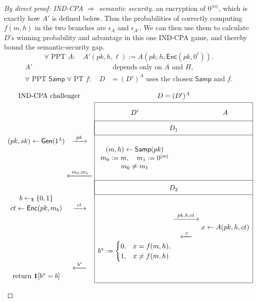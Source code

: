 \documentclass[12pt,a4paper]{article}
\theoremstyle{definition}
\theoremstyle{remark}
\begin{document}
\begin{proof}[By direct proof: IND-CPA $\Longrightarrow$ semantic security]
an encryption of $0^{|m|}$, which is exactly how $A'$ is defined below.
Thus the probabilities of correctly computing $f(m,h)$ in the two branches
are $\epsilon_A$ and $\epsilon_{A'}$. We can then use them to calculate
$D$'s winning probability and advantage in this one IND-CPA game,
and thereby bound the semantic-security gap.
\[
\forall\text{ PPT }A:\quad
A'(pk,h,\ell):=A(pk,h,\mathsf{Enc}(pk,0^\ell)).
\]
\[
\begin{aligned}
A'&\text{ depends only on }A\text{ and }\Pi,\\
\forall\text{ PPT }\mathsf{Samp}\;\forall\text{ PT }f:\quad
D&=(D')^A\text{ uses the chosen }\mathsf{Samp}\text{ and }f.
\end{aligned}
\]
\par\pagebreak[0]
\begin{samepage}
\begingroup\small
\[
\begin{array}{c@{\;}c@{\;}|c@{\;}c@{\;}c|}
\multicolumn{2}{c}{\text{IND-CPA challenger}}&\multicolumn{3}{c}{D=(D')^A}\\[3pt]
\cline{3-5}
&&\rule{0pt}{18pt}D'&&A\\[5pt]
\cline{3-5}
&&\multicolumn{3}{|c|}{\rule{0pt}{14pt}D_1}\\[3pt]
\cline{3-5}
(pk,sk)\leftarrow\mathsf{Gen}(1^\lambda)
&\xrightarrow{\ pk\ }&&&\\
&&(m,h)\leftarrow\mathsf{Samp}(pk)&&\\
&&m_0:=m,\quad m_1:=0^{|m|}&&\\
&&m_0\ne m_1&&\\
&\xleftarrow{\ m_0,m_1\ }&&&\\
\cline{3-5}
&&\multicolumn{3}{|c|}{\rule{0pt}{14pt}D_2}\\[3pt]
\cline{3-5}
b\leftarrow_{\$}\{0,1\}&&&&\\
ct\leftarrow\mathsf{Enc}(pk,m_b)
&\xrightarrow{\ ct\ }&&&\\
&&&\xrightarrow{\ pk,h,ct\ }&\\
&&&&x\leftarrow A(pk,h,ct)\\
&&&\xleftarrow{\ x\ }&\\
&&b^*:=\begin{cases}
0,&x=f(m,h),\\
1,&x\ne f(m,h)
\end{cases}&&\\
&\xleftarrow{\ b^*\ }&&&\\
\mathrm{return}\ \mathbf{1}[b^*=b]&&&&\\[3pt]
\cline{3-5}
\end{array}
\]
\endgroup

\end{samepage}
\end{proof}
\end{document}

